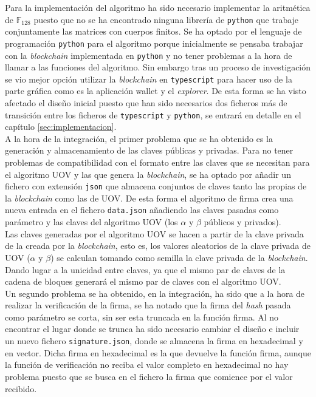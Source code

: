 Para la implementación del algoritmo ha sido necesario implementar la aritmética de $\mathds{F}_{128}$ puesto que no se ha encontrado ninguna librería de \texttt{python} que trabaje conjuntamente las matrices con cuerpos finitos. Se ha optado por el lenguaje de programación \texttt{python} para el algoritmo porque inicialmente se pensaba trabajar con la \textit{blockchain} implementada en \texttt{python} y no tener problemas a la hora de llamar a las funciones del algoritmo. Sin embargo tras un proceso de investigación se vio mejor opción utilizar la \textit{blockchain} en \texttt{typescript} para hacer uso de la parte gráfica como es la aplicación wallet y el \textit{explorer}. De esta forma se ha visto afectado el diseño inicial puesto que han sido necesarios dos ficheros más de transición entre los ficheros de \texttt{typescript} y \texttt{python}, se entrará en detalle en el capítulo \ref{sec:implementacion}.\\

A la hora de la integración, el primer problema que se ha obtenido es la generación y almacenamiento de las claves públicas y privadas. Para no tener problemas de compatibilidad con el formato entre las claves que se necesitan para el algoritmo UOV y las que genera la \textit{blockchain}, se ha optado por añadir un fichero con extensión \texttt{json} que almacena conjuntos de claves tanto las propias de la \textit{blockchain} como las de UOV. De esta forma el algoritmo de firma crea una nueva entrada en el fichero \texttt{data.json} añadiendo las claves pasadas como parámetro y las claves del algoritmo UOV (los $\alpha$ y $\beta$ públicos y privados).\\

Las claves generadas por el algoritmo UOV se hacen a partir de la clave privada de la creada por la \textit{blockchain}, esto es, los valores aleatorios de la clave privada de UOV ($\alpha$ y $\beta$) se calculan tomando como semilla la clave privada de la \textit{blockchain}. Dando lugar a la unicidad entre claves, ya que el mismo par de claves de la cadena de bloques generará el mismo par de claves con el algoritmo UOV.\\

Un segundo problema se ha obtenido, en la integración, ha sido que a la hora de realizar la verificación de la firma, se ha notado que la firma del \textit{hash} pasada como parámetro se corta, sin ser esta truncada en la función firma. Al no encontrar el lugar donde se trunca ha sido necesario cambiar el diseño e incluir un nuevo fichero \texttt{signature.json}, donde se almacena la firma en hexadecimal y en vector. Dicha firma en hexadecimal es la que devuelve la función firma, aunque la función de verificación no reciba el valor completo en hexadecimal no hay problema puesto que se busca en el fichero la firma que comience por el valor recibido. %

